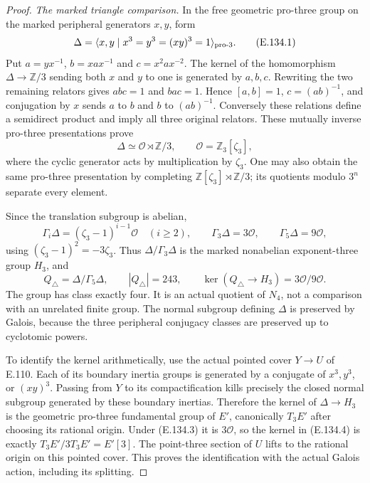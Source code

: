 \begin{proof}
\emph{The marked triangle comparison.}
In the free geometric pro-three group on the marked
peripheral generators $x,y$, form
\[
 \Delta=\langle x,y\mid x^3=y^3=(xy)^3=1\rangle_{\rm pro\text{-}3}.
 \tag{E.134.1}
\]
Put $a=yx^{-1}$, $b=xax^{-1}$ and
$c=x^2ax^{-2}$. The kernel of the homomorphism
$\Delta\to\mathbb Z/3$ sending both $x$ and $y$ to
one is generated by $a,b,c$. Rewriting the two
remaining relators gives $abc=1$ and $bac=1$.
Hence $[a,b]=1$, $c=(ab)^{-1}$, and conjugation by
$x$ sends $a$ to $b$ and $b$ to $(ab)^{-1}$.
Conversely these relations define a semidirect
product and imply all three original relators.
These mutually inverse pro-three presentations prove
\[
 \Delta\simeq\mathcal O\rtimes\mathbb Z/3,
 \qquad \mathcal O=\mathbb Z_3[\zeta_3],
 \tag{E.134.2}
\]
where the cyclic generator acts by multiplication by
$\zeta_3$. One may also obtain the same pro-three
presentation by completing
$\mathbb Z[\zeta_3]\rtimes\mathbb Z/3$; its quotients
modulo $3^n$ separate every element.

Since the translation subgroup is abelian,
\[
 \Gamma_i\Delta=(\zeta_3-1)^{i-1}\mathcal O
       \quad(i\ge2),\qquad
 \Gamma_3\Delta=3\mathcal O,\qquad
 \Gamma_5\Delta=9\mathcal O,
 \tag{E.134.3}
\]
using $(\zeta_3-1)^2=-3\zeta_3$.
Thus $\Delta/\Gamma_3\Delta$ is the marked
nonabelian exponent-three group $H_3$, and
\[
 Q_\triangle=\Delta/\Gamma_5\Delta,
 \qquad |Q_\triangle|=243,
 \qquad
 \ker(Q_\triangle\to H_3)=3\mathcal O/9\mathcal O.
 \tag{E.134.4}
\]
The group has class exactly four. It is an actual
quotient of $N_4$, not a comparison with an unrelated
finite group. The normal subgroup defining
$\Delta$ is preserved by Galois, because the three
peripheral conjugacy classes are preserved up to
cyclotomic powers.

To identify the kernel arithmetically, use the actual
pointed cover $Y\to U$ of E.110. Each of its boundary
inertia groups is generated by a conjugate of
$x^3,y^3$, or $(xy)^3$. Passing from $Y$ to its
compactification kills precisely the closed normal
subgroup generated by these boundary inertias.
Therefore the kernel of $\Delta\to H_3$ is the
geometric pro-three fundamental group of $E'$,
canonically $T_3E'$ after choosing its rational
origin. Under (E.134.3) it is $3\mathcal O$, so
the kernel in (E.134.4) is exactly $T_3E'/3T_3E'
=E'[3]$. The point-three section of $U$ lifts to
the rational origin on this pointed cover.
This proves the identification with the actual
Galois action, including its splitting.


\end{proof}
